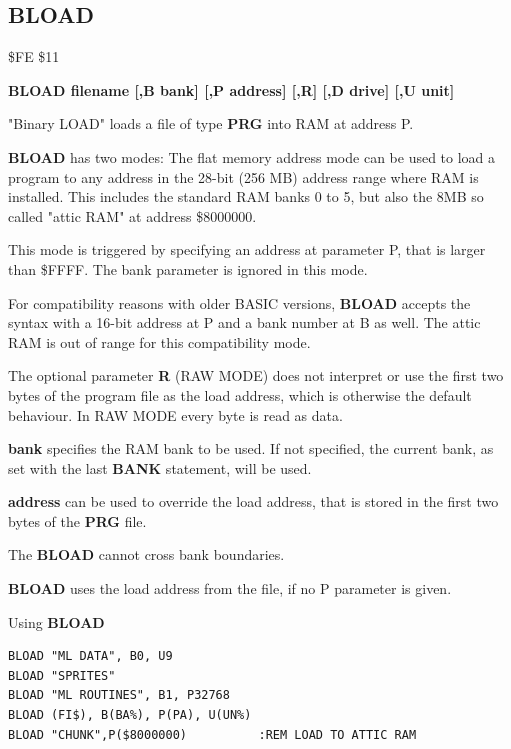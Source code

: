 \subsection{BLOAD}
\begin{description}[leftmargin=2cm,style=nextline]
\item [Token:] \$FE \$11
\item [Format:] {\bf BLOAD filename [,B bank] [,P address] [,R] [,D drive] [,U unit] }
\item [Usage:]
   "Binary LOAD" loads a file of type {\bf PRG} into RAM at address P.

   {\bf BLOAD} has two modes:
   The flat memory address mode can be used to load a program to any
   address in the 28-bit (256 MB) address range where RAM is installed.
   This includes the standard RAM banks 0 to 5, but also
   the 8MB so called "attic RAM" at address \$8000000.

   This mode is triggered by specifying an address at parameter P,
   that is larger than \$FFFF. The bank parameter is ignored in this mode.

   For compatibility reasons with older BASIC versions, {\bf BLOAD}
   accepts the syntax with a 16-bit address at P and a bank number at B as well.
   The attic RAM is out of range for this compatibility mode.

   The optional parameter {\bf R} (RAW MODE) does not interpret or use the
   first two bytes of the program file as the load address, which is otherwise the
   default behaviour. In RAW MODE every byte is read as data.

   \filenamedefinition

   {\bf bank} specifies the RAM bank to be used.
   If not specified, the current bank, as set with the last
   {\bf BANK} statement, will be used.

   {\bf address} can be used to override the load address,
   that is stored in the first two bytes of the {\bf PRG} file.

   \drivedefinition

   \unitdefinition

\item [Remarks:]
   The {\bf BLOAD} cannot cross bank boundaries.

{\bf BLOAD} uses the load address from the file, if no P parameter is given.

\item [Examples:] Using {\bf BLOAD}
\begin{tcolorbox}[colback=black,coltext=white]
\verbatimfont{\codefont}
\begin{verbatim}
BLOAD "ML DATA", B0, U9
BLOAD "SPRITES"
BLOAD "ML ROUTINES", B1, P32768
BLOAD (FI$), B(BA%), P(PA), U(UN%)
BLOAD "CHUNK",P($8000000)          :REM LOAD TO ATTIC RAM
\end{verbatim}
\end{tcolorbox}
\end{description}

